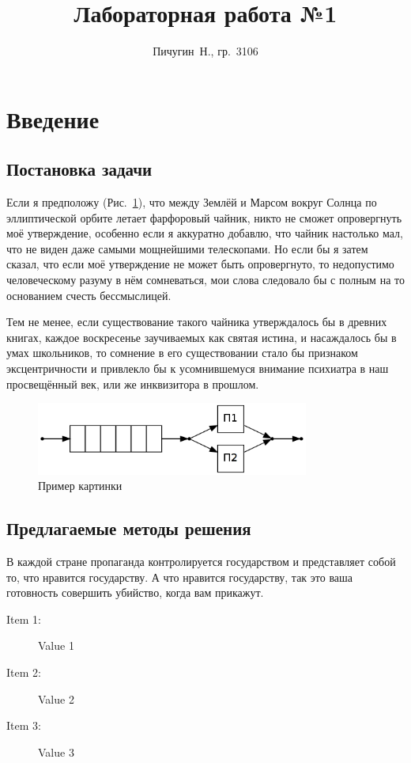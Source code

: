 \documentclass[12pt, a4paper]{article}
\begin{document}
\title{Лабораторная работа №1}
\author{Пичугин~Н., гр.~3106}
\maketitle

\tableofcontents
\newpage

\section{Введение}

\subsection{Постановка задачи}
Если я предположу (Рис.~\ref{fig:sample1}), что между Землёй и Марсом 
вокруг Солнца по эллиптической орбите летает фарфоровый чайник, никто не 
сможет опровергнуть моё утверждение, особенно если я аккуратно добавлю, что 
чайник настолько мал, что не виден даже самыми мощнейшими телескопами. Но 
если бы я затем сказал, что если моё утверждение не может быть 
опровергнуто, то недопустимо человеческому разуму в нём сомневаться, мои 
слова следовало бы с полным на то основанием счесть бессмыслицей.
\par
Тем не менее, если существование такого чайника утверждалось бы в древних 
книгах, каждое воскресенье заучиваемых как святая истина, и насаждалось бы 
в умах школьников, то сомнение в его существовании стало бы признаком 
эксцентричности и привлекло бы к усомнившемуся внимание психиатра в наш 
просвещённый век, или же инквизитора в прошлом.

\begin{figure}[H]
    \centering
    \includegraphics[width=0.8\textwidth]{sample1.png}
    \caption{Пример картинки}
    \label{fig:sample1}
\end{figure}

\subsection{Предлагаемые методы решения}
В каждой стране пропаганда контролируется государством и представляет 
собой то, что нравится государству. А что нравится государству, так это 
ваша готовность совершить убийство, когда вам прикажут.
\begin{description}  %
    \item[Item 1:] Value 1
    \item[Item 2:] Value 2
    \item[Item 3:] Value 3
\end{description}
\end{document}
